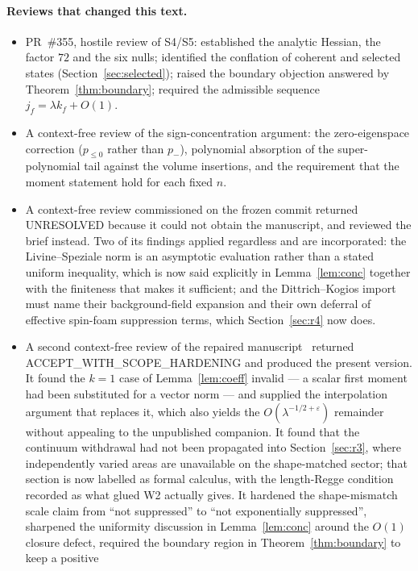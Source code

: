 \documentclass[11pt]{article}
\numberwithin{equation}{section}
\theoremstyle{definition}
\theoremstyle{remark}
\begin{document}
\paragraph{Reviews that changed this text.}
\begin{itemize}
\item PR~\#355, hostile review of S4/S5: established the analytic Hessian, the
factor $72$ and the six nulls; identified the conflation of coherent and
selected states (Section~\ref{sec:selected}); raised the boundary objection
answered by Theorem~\ref{thm:boundary}; required the admissible sequence
$j_f=\lambda k_f+O(1)$.
\item A context-free review of the sign-concentration argument: the
zero-eigenspace correction ($p_{\le0}$ rather than $p_-$), polynomial
absorption of the super-polynomial tail against the volume insertions, and the
requirement that the moment statement hold for each fixed $n$.
\item A context-free review commissioned on the frozen commit returned
UNRESOLVED because it could not obtain the manuscript, and reviewed the brief
instead. Two of its findings applied regardless and are incorporated: the
Livine--Speziale norm is an asymptotic evaluation rather than a stated uniform
inequality, which is now said explicitly in Lemma~\ref{lem:conc} together with
the finiteness that makes it sufficient; and the Dittrich--Kogios import must
name their background-field expansion and their own deferral of effective
spin-foam suppression terms, which Section~\ref{sec:r4} now does.
\item A second context-free review of the repaired manuscript~\cite{PR358}
returned ACCEPT\_WITH\_SCOPE\_HARDENING and produced the present version. It
found the $k=1$ case of Lemma~\ref{lem:coeff} invalid --- a scalar first moment
had been substituted for a vector norm --- and supplied the interpolation
argument that replaces it, which also yields the $O(\lambda^{-1/2+\varepsilon})$
remainder without appealing to the unpublished companion. It found that the
continuum withdrawal had not been propagated into Section~\ref{sec:r3}, where
independently varied areas are unavailable on the shape-matched sector; that
section is now labelled as formal calculus, with the length-Regge condition
recorded as what glued W2 actually gives. It hardened the shape-mismatch scale
claim from ``not suppressed'' to ``not exponentially suppressed'', sharpened the
uniformity discussion in Lemma~\ref{lem:conc} around the $O(1)$ closure defect,
required the boundary region in Theorem~\ref{thm:boundary} to keep a positive

\end{itemize}
\end{document}
